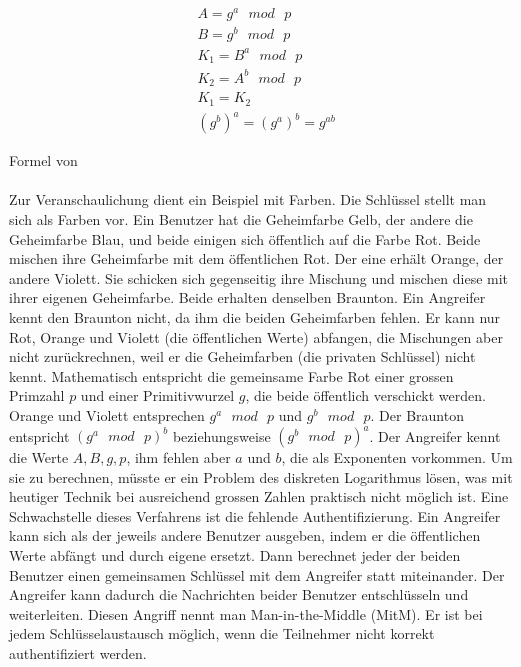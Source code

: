 \begin{align}
&A=g^a\mbox{ }mod\mbox{ }p\\
&B=g^b\mbox{ }mod\mbox{ }p\\
&K_1=B^a\mbox{ }mod\mbox{ }p\\
&K_2=A^b\mbox{ }mod\mbox{ }p\\
&K_1=K_2\\
&(g^b)^a=(g^a)^b=g^{ab}
\end{align}

Formel von \cite{DiffieHellmanMerkleSchlusselaustausch}\\\\

Zur Veranschaulichung dient ein Beispiel mit Farben. Die Schlüssel stellt man sich als Farben vor. Ein Benutzer hat die Geheimfarbe Gelb, der andere die Geheimfarbe Blau, und beide einigen sich öffentlich auf die Farbe Rot. Beide mischen ihre Geheimfarbe mit dem öffentlichen Rot. Der eine erhält Orange, der andere Violett. Sie schicken sich gegenseitig ihre Mischung und mischen diese mit ihrer eigenen Geheimfarbe. Beide erhalten denselben Braunton. Ein Angreifer kennt den Braunton nicht, da ihm die beiden Geheimfarben fehlen. Er kann nur Rot, Orange und Violett (die öffentlichen Werte) abfangen, die Mischungen aber nicht zurückrechnen, weil er die Geheimfarben (die privaten Schlüssel) nicht kennt.
Mathematisch entspricht die gemeinsame Farbe Rot einer grossen Primzahl \(p\) und einer Primitivwurzel \(g\), die beide öffentlich verschickt werden. Orange und Violett entsprechen \(g^a\mbox{ }mod\mbox{ }p\) und \(g^b\mbox{ }mod\mbox{ }p\). Der Braunton entspricht \((g^a\mbox{ }mod\mbox{ }p)^b\) beziehungsweise \((g^b\mbox{ }mod\mbox{ }p)^a\). Der Angreifer kennt die Werte \(A,B,g,p\), ihm fehlen aber \(a\) und \(b\), die als Exponenten vorkommen. Um sie zu berechnen, müsste er ein Problem des diskreten Logarithmus lösen, was mit heutiger Technik bei ausreichend grossen Zahlen praktisch nicht möglich ist.
Eine Schwachstelle dieses Verfahrens ist die fehlende Authentifizierung. Ein Angreifer kann sich als der jeweils andere Benutzer ausgeben, indem er die öffentlichen Werte abfängt und durch eigene ersetzt. Dann berechnet jeder der beiden Benutzer einen gemeinsamen Schlüssel mit dem Angreifer statt miteinander. Der Angreifer kann dadurch die Nachrichten beider Benutzer entschlüsseln und weiterleiten. Diesen Angriff nennt man Man-in-the-Middle (MitM). Er ist bei jedem Schlüsselaustausch möglich, wenn die Teilnehmer nicht korrekt authentifiziert werden.

